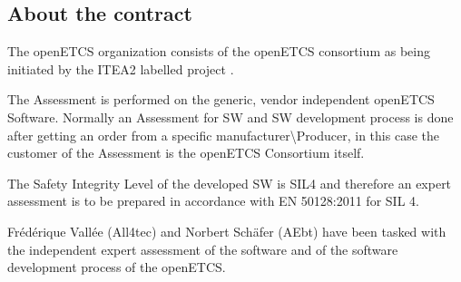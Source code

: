 \bigskip

\clearpage
\bigskip

\subsection{About the contract}

The openETCS organization consists of the openETCS consortium \cite{openETCS} as being initiated by the ITEA2 labelled project \cite{openETCSITEA2}. 

The Assessment is performed on the generic, vendor independent openETCS Software. 
Normally an Assessment for SW and SW development process is done after getting an order from a specific manufacturer{\textbackslash}Producer, 
in this case the customer of the Assessment is the openETCS Consortium itself.

The Safety Integrity Level of the developed SW is SIL4 and therefore an expert assessment is to be prepared in
accordance with EN 50128:2011 for SIL 4.

Fr\'ed\'erique Vall\'ee (All4tec) and Norbert Sch\"afer (AEbt) have been tasked with the independent expert
assessment of the software and of the software development process of the openETCS.


\bigskip
